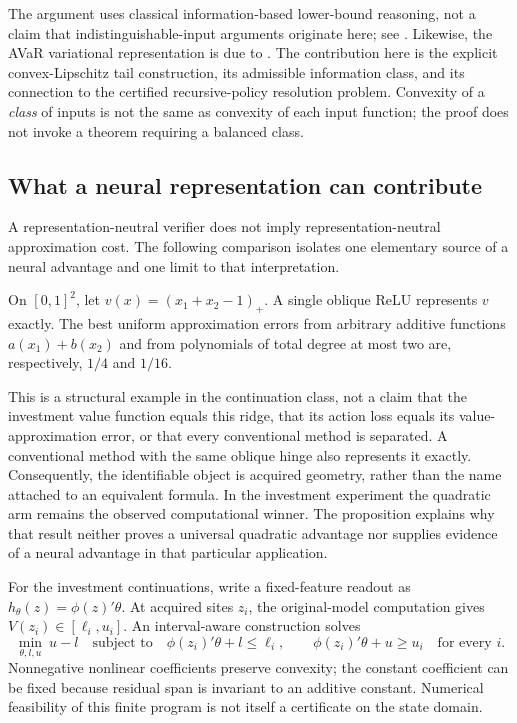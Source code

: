 The argument uses classical information-based lower-bound reasoning, not a claim that indistinguishable-input arguments originate here; see \citet{Novak2015Integration97}. Likewise, the AVaR variational representation is due to \citet{RockafellarUryasev2000}. The contribution here is the explicit convex-Lipschitz tail construction, its admissible information class, and its connection to the certified recursive-policy resolution problem. Convexity of a \emph{class} of inputs is not the same as convexity of each input function; the proof does not invoke a theorem requiring a balanced class.

\subsection{What a neural representation can contribute}
A representation-neutral verifier does not imply representation-neutral approximation cost. The following comparison isolates one elementary source of a neural advantage and one limit to that interpretation.

\begin{proposition}\label{prop:ridge97}
On $[0,1]^2$, let $v(x)=(x_1+x_2-1)_+$. A single oblique ReLU represents $v$ exactly. The best uniform approximation errors from arbitrary additive functions $a(x_1)+b(x_2)$ and from polynomials of total degree at most two are, respectively, $1/4$ and $1/16$.
\end{proposition}

This is a structural example in the continuation class, not a claim that the investment value function equals this ridge, that its action loss equals its value-approximation error, or that every conventional method is separated. A conventional method with the same oblique hinge also represents it exactly. Consequently, the identifiable object is acquired geometry, rather than the name attached to an equivalent formula. In the investment experiment the quadratic arm remains the observed computational winner. The proposition explains why that result neither proves a universal quadratic advantage nor supplies evidence of a neural advantage in that particular application.

For the investment continuations, write a fixed-feature readout as $h_\theta(z)=\phi(z)'\theta$. At acquired sites $z_i$, the original-model computation gives $V(z_i)\in[\ell_i,u_i]$. An interval-aware construction solves
\begin{equation}\label{eq:readout97}
 \min_{\theta,l,u}\ u-l\quad\text{subject to}\quad
 \phi(z_i)'\theta+l\leq\ell_i,\qquad
 \phi(z_i)'\theta+u\geq u_i\quad\text{for every }i.
\end{equation}
Nonnegative nonlinear coefficients preserve convexity; the constant coefficient can be fixed because residual span is invariant to an additive constant. Numerical feasibility of this finite program is not itself a certificate on the state domain.

